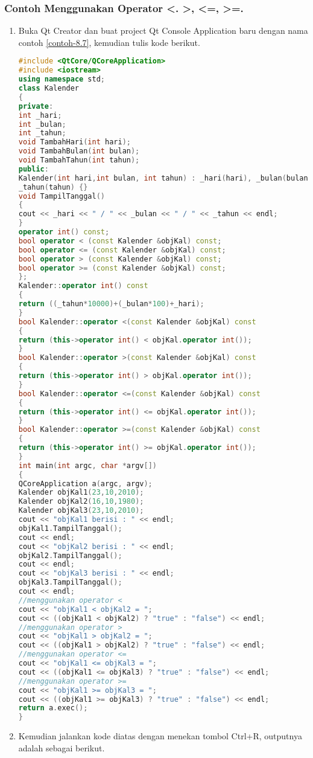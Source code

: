 \subsubsection*{Contoh  Menggunakan Operator \textless{}. \textgreater{}, \textless{}=, \textgreater{}=.}
\begin{enumerate}
\def\labelenumi{\arabic{enumi}.}
\item
  Buka Qt Creator dan buat project Qt Console Application baru dengan
  nama contoh \ref{contoh-8.7}, kemudian tulis kode berikut.

\begin{lstlisting}[language=c++, caption=Menggunakan Operator Overloading, label=contoh-8.7]
#include <QtCore/QCoreApplication>
#include <iostream>
using namespace std;
class Kalender
{
private:
int _hari;
int _bulan;
int _tahun;
void TambahHari(int hari);
void TambahBulan(int bulan);
void TambahTahun(int tahun);
public:
Kalender(int hari,int bulan, int tahun) : _hari(hari), _bulan(bulan),
_tahun(tahun) {}
void TampilTanggal()
{
cout << _hari << " / " << _bulan << " / " << _tahun << endl;
}
operator int() const;
bool operator < (const Kalender &objKal) const;
bool operator <= (const Kalender &objKal) const;
bool operator > (const Kalender &objKal) const;
bool operator >= (const Kalender &objKal) const;
};
Kalender::operator int() const
{
return ((_tahun*10000)+(_bulan*100)+_hari);
}
bool Kalender::operator <(const Kalender &objKal) const
{
return (this->operator int() < objKal.operator int());
}
bool Kalender::operator >(const Kalender &objKal) const
{
return (this->operator int() > objKal.operator int());
}
bool Kalender::operator <=(const Kalender &objKal) const
{
return (this->operator int() <= objKal.operator int());
}
bool Kalender::operator >=(const Kalender &objKal) const
{
return (this->operator int() >= objKal.operator int());
}
int main(int argc, char *argv[])
{
QCoreApplication a(argc, argv);
Kalender objKal1(23,10,2010);
Kalender objKal2(16,10,1980);
Kalender objKal3(23,10,2010);
cout << "objKal1 berisi : " << endl;
objKal1.TampilTanggal();
cout << endl;
cout << "objKal2 berisi : " << endl;
objKal2.TampilTanggal();
cout << endl;
cout << "objKal3 berisi : " << endl;
objKal3.TampilTanggal();
cout << endl;
//menggunakan operator <
cout << "objKal1 < objKal2 = ";
cout << ((objKal1 < objKal2) ? "true" : "false") << endl;
//menggunakan operator >
cout << "objKal1 > objKal2 = ";
cout << ((objKal1 > objKal2) ? "true" : "false") << endl;
//menggunakan operator <=
cout << "objKal1 <= objKal3 = ";
cout << ((objKal1 <= objKal3) ? "true" : "false") << endl;
//menggunakan operator >=
cout << "objKal1 >= objKal3 = ";
cout << ((objKal1 >= objKal3) ? "true" : "false") << endl;
return a.exec();
}
\end{lstlisting}
\item
  Kemudian jalankan kode diatas dengan menekan tombol Ctrl+R, outputnya
  adalah sebagai berikut.
\end{enumerate}

